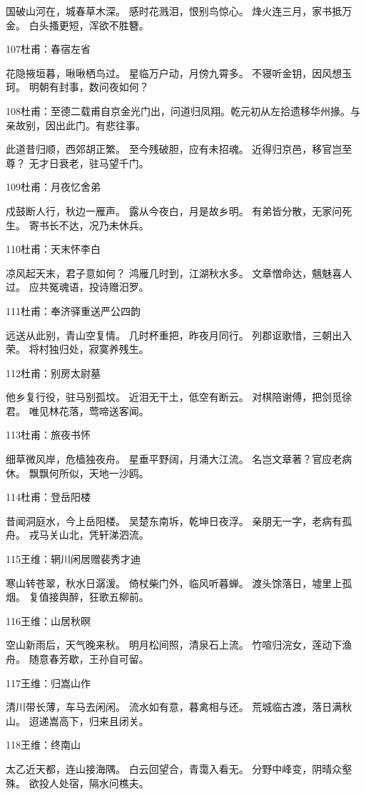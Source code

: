 国破山河在，城春草木深。
感时花溅泪，恨别鸟惊心。
烽火连三月，家书抵万金。
白头搔更短，浑欲不胜簪。

107杜甫：春宿左省

花隐掖垣暮，啾啾栖鸟过。
星临万户动，月傍九霄多。
不寝听金钥，因风想玉珂。
明朝有封事，数问夜如何？

108杜甫：至德二载甫自京金光门出，问道归凤翔。乾元初从左拾遗移华州掾。与亲故别，因出此门。有悲往事。

此道昔归顺，西郊胡正繁。
至今残破胆，应有未招魂。
近得归京邑，移官岂至尊？
无才日衰老，驻马望千门。

109杜甫：月夜忆舍弟

戍鼓断人行，秋边一雁声。
露从今夜白，月是故乡明。
有弟皆分散，无家问死生。
寄书长不达，况乃未休兵。

110杜甫：天末怀李白

凉风起天末，君子意如何？
鸿雁几时到，江湖秋水多。
文章憎命达，魑魅喜人过。
应共冤魂语，投诗赠汨罗。

111杜甫：奉济驿重送严公四韵

远送从此别，青山空复情。
几时杯重把，昨夜月同行。
列郡讴歌惜，三朝出入荣。
将村独归处，寂寞养残生。

112杜甫：别房太尉墓

他乡复行役，驻马别孤坟。
近泪无干土，低空有断云。
对棋陪谢傅，把剑觅徐君。
唯见林花落，莺啼送客闻。

113杜甫：旅夜书怀

细草微风岸，危樯独夜舟。
星垂平野阔，月涌大江流。
名岂文章著？官应老病休。
飘飘何所似，天地一沙鸥。

114杜甫：登岳阳楼

昔闻洞庭水，今上岳阳楼。
吴楚东南坼，乾坤日夜浮。
亲朋无一字，老病有孤舟。
戎马关山北，凭轩涕泗流。

115王维：辋川闲居赠裴秀才迪

寒山转苍翠，秋水日潺湲。
倚杖柴门外，临风听暮蝉。
渡头馀落日，墟里上孤烟。
复值接舆醉，狂歌五柳前。

116王维：山居秋暝

空山新雨后，天气晚来秋。
明月松间照，清泉石上流。
竹喧归浣女，莲动下渔舟。
随意春芳歇，王孙自可留。

117王维：归嵩山作

清川带长薄，车马去闲闲。
流水如有意，暮禽相与还。
荒城临古渡，落日满秋山。
迢递嵩高下，归来且闭关。

118王维：终南山

太乙近天都，连山接海隅。
白云回望合，青霭入看无。
分野中峰变，阴晴众壑殊。
欲投人处宿，隔水问樵夫。

